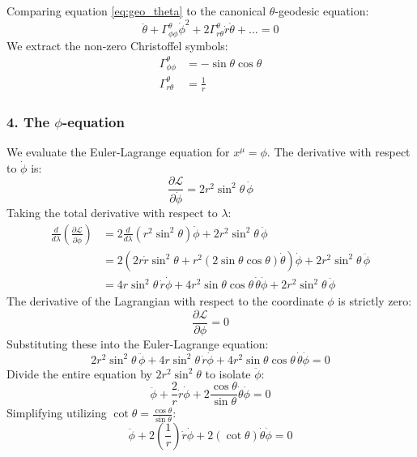 \documentclass[11pt, a4paper]{report}
\begin{document}
Comparing equation \eqref{eq:geo_theta} to the canonical $\theta$-geodesic equation:
\begin{equation}
    \ddot{\theta} + \Gamma^\theta_{\phi\phi}\dot{\phi}^2 + 2\Gamma^\theta_{r\theta}\dot{r}\dot{\theta} + \dots = 0
\end{equation}
We extract the non-zero Christoffel symbols:
\begin{align}
    \Gamma^\theta_{\phi\phi} &= -\sin\theta \cos\theta \\
    \Gamma^\theta_{r\theta} &= \frac{1}{r}
\end{align}

\subsubsection*{4. The $\phi$-equation}

We evaluate the Euler-Lagrange equation for $x^\mu = \phi$.
The derivative with respect to $\dot{\phi}$ is:
\begin{equation}
    \frac{\partial \mathcal{L}}{\partial \dot{\phi}} = 2r^2 \sin^2\theta \, \dot{\phi}
\end{equation}
Taking the total derivative with respect to $\lambda$:
\begin{align}
    \frac{d}{d\lambda} \left( \frac{\partial \mathcal{L}}{\partial \dot{\phi}} \right) &= 2 \frac{d}{d\lambda} (r^2 \sin^2\theta) \dot{\phi} + 2r^2 \sin^2\theta \, \ddot{\phi} \nonumber \\
    &= 2 \left( 2r\dot{r} \sin^2\theta + r^2 (2\sin\theta\cos\theta)\dot{\theta} \right) \dot{\phi} + 2r^2 \sin^2\theta \, \ddot{\phi} \nonumber \\
    &= 4r\sin^2\theta \, \dot{r}\dot{\phi} + 4r^2 \sin\theta \cos\theta \, \dot{\theta}\dot{\phi} + 2r^2 \sin^2\theta \, \ddot{\phi}
\end{align}
The derivative of the Lagrangian with respect to the coordinate $\phi$ is strictly zero:
\begin{equation}
    \frac{\partial \mathcal{L}}{\partial \phi} = 0
\end{equation}
Substituting these into the Euler-Lagrange equation:
\begin{equation}
    2r^2 \sin^2\theta \, \ddot{\phi} + 4r\sin^2\theta \, \dot{r}\dot{\phi} + 4r^2 \sin\theta \cos\theta \, \dot{\theta}\dot{\phi} = 0
\end{equation}
Divide the entire equation by $2r^2 \sin^2\theta$ to isolate $\ddot{\phi}$:
\begin{equation}
    \ddot{\phi} + \frac{2}{r} \dot{r}\dot{\phi} + 2 \frac{\cos\theta}{\sin\theta} \dot{\theta}\dot{\phi} = 0
\end{equation}
Simplifying utilizing $\cot\theta = \frac{\cos\theta}{\sin\theta}$:
\begin{equation}
    \ddot{\phi} + 2 \left(\frac{1}{r}\right) \dot{r}\dot{\phi} + 2 (\cot\theta) \dot{\theta}\dot{\phi} = 0 \label{eq:geo_phi}
\end{equation}
\end{document}
